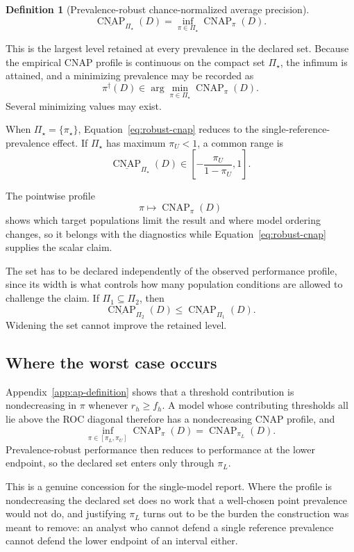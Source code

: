 \documentclass[11pt]{article}
\newcommand{\CNAP}{\operatorname{CNAP}}
\newcommand{\PSet}{\Pi_\star}
\newcommand{\RobCNAP}{\underline{\CNAP}_{\PSet}}
\newtheorem{definition}{Definition}
\theoremstyle{remark}
\begin{document}
\begin{definition}[Prevalence-robust chance-normalized average precision]
\begin{equation}
\RobCNAP(D)
=
\inf_{\pi\in\PSet}\CNAP_\pi(D).
\label{eq:robust-cnap}
\end{equation}
\end{definition}

This is the largest level retained at every prevalence in the declared set. Because the empirical CNAP profile is continuous on the compact set $\PSet$, the infimum is attained, and a minimizing prevalence may be recorded as
\[
\pi^\dagger(D)
\in
\arg\min_{\pi\in\PSet}\CNAP_\pi(D).
\]
Several minimizing values may exist.

When $\PSet=\{\pi_\star\}$, Equation~\eqref{eq:robust-cnap} reduces to the single-reference-prevalence effect. If $\PSet$ has maximum $\pi_U<1$, a common range is
\[
\RobCNAP(D)
\in
\left[-\frac{\pi_U}{1-\pi_U},1\right].
\]

The pointwise profile
\[
\pi\longmapsto\CNAP_\pi(D)
\]
shows which target populations limit the result and where model ordering changes, so it belongs with the diagnostics while Equation~\eqref{eq:robust-cnap} supplies the scalar claim.

The set has to be declared independently of the observed performance profile, since its width is what controls how many population conditions are allowed to challenge the claim. If $\Pi_1\subseteq\Pi_2$, then
\[
\underline{\CNAP}_{\Pi_2}(D)
\leq
\underline{\CNAP}_{\Pi_1}(D).
\]
Widening the set cannot improve the retained level.

\subsection{Where the worst case occurs}
\label{sec:worst-case}

Appendix~\ref{app:ap-definition} shows that a threshold contribution is nondecreasing in $\pi$ whenever $r_h\geq f_h$. A model whose contributing thresholds all lie above the ROC diagonal therefore has a nondecreasing CNAP profile, and
\[
\inf_{\pi\in[\pi_L,\pi_U]}\CNAP_\pi(D)
=
\CNAP_{\pi_L}(D).
\]
Prevalence-robust performance then reduces to performance at the lower endpoint, so the declared set enters only through $\pi_L$.

This is a genuine concession for the single-model report. Where the profile is nondecreasing the declared set does no work that a well-chosen point prevalence would not do, and justifying $\pi_L$ turns out to be the burden the construction was meant to remove: an analyst who cannot defend a single reference prevalence cannot defend the lower endpoint of an interval either.
\end{document}
